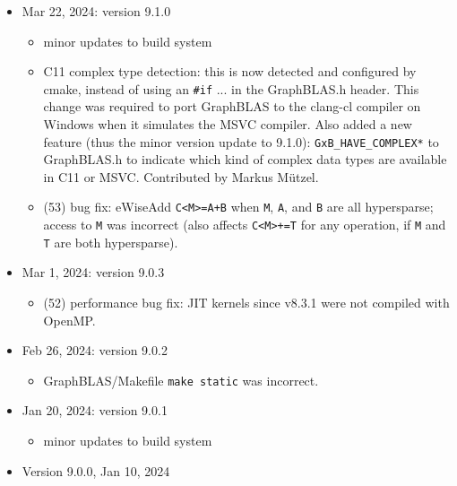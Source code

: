 \begin{itemize}
\item Mar 22, 2024: version 9.1.0

    \begin{itemize}
    \item minor updates to build system
    \item C11 complex type detection:  this is now detected and configured by
        cmake, instead of using an \verb'#if' ... in the GraphBLAS.h header.
        This change was required to port GraphBLAS to the clang-cl compiler
        on Windows when it simulates the MSVC compiler.  Also added a new
        feature (thus the minor version update to 9.1.0):
        \verb'GxB_HAVE_COMPLEX*' to
        GraphBLAS.h to indicate which kind of complex data types are available
        in C11 or MSVC.  Contributed by Markus M\"{u}tzel.
    \item (53) bug fix: eWiseAdd \verb'C<M>=A+B' when \verb'M', \verb'A',
        and \verb'B' are all hypersparse; access to \verb'M' was incorrect
        (also affects \verb'C<M>+=T' for any operation, if \verb'M' and
        \verb'T' are both hypersparse).
    \end{itemize}

\item Mar 1, 2024: version 9.0.3

    \begin{itemize}
    \item (52) performance bug fix: JIT kernels since v8.3.1 were not compiled
    with OpenMP.
    \end{itemize}

\item Feb 26, 2024: version 9.0.2

    \begin{itemize}
    \item GraphBLAS/Makefile \verb"make static" was incorrect.
    \end{itemize}

\item Jan 20, 2024: version 9.0.1

    \begin{itemize}
    \item minor updates to build system
    \end{itemize}

\item Version 9.0.0, Jan 10, 2024


\end{itemize}
